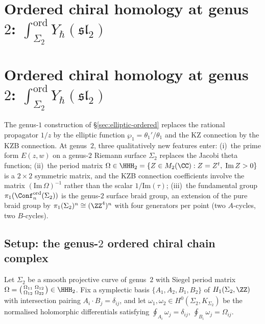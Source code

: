 
\section{Ordered chiral homology at genus~$2$:
$\int_{\Sigma_2}^{\mathrm{ord}} Y_\hbar(\mathfrak{sl}_2)$}


\section{Ordered chiral homology at genus~$2$:
$\int_{\Sigma_2}^{\mathrm{ord}} Y_\hbar(\mathfrak{sl}_2)$}
\label{sec:genus2-ordered}

The genus-$1$ construction of \S\ref{sec:elliptic-ordered}
replaces the rational propagator $1/z$ by the elliptic
function $\wp_1 = \theta_1'/\theta_1$ and the KZ connection
by the KZB connection. At genus~$2$, three qualitatively
new features enter: (i)~the prime form $E(z,w)$ on a
genus-$2$ Riemann surface $\Sigma_2$ replaces the Jacobi
theta function; (ii)~the period matrix
$\Omega \in \HHH_2 = \{Z \in M_2(\CC) : Z = Z^t,\;
\mathrm{Im}\,Z > 0\}$ is a $2 \times 2$ symmetric matrix,
and the KZB connection coefficients involve the matrix
$(\mathrm{Im}\,\Omega)^{-1}$ rather than the scalar
$1/\mathrm{Im}(\tau)$; (iii)~the fundamental group
$\pi_1(\Conf_n^{\mathrm{ord}}(\Sigma_2))$ is the genus-$2$
surface braid group, an extension of the pure braid group
by $\pi_1(\Sigma_2)^n \cong (\ZZ^4)^n$ with four generators
per point (two $A$-cycles, two $B$-cycles).

\subsection{Setup: the genus-$2$ ordered chiral chain
complex}
\label{subsec:genus2-setup}

Let $\Sigma_2$ be a smooth projective curve of genus~$2$
with Siegel period matrix
$\Omega = \bigl(\begin{smallmatrix}
\Omega_{11} & \Omega_{12} \\
\Omega_{12} & \Omega_{22}
\end{smallmatrix}\bigr)
\in \HHH_2$.
Fix a symplectic basis
$\{A_1, A_2, B_1, B_2\}$ of $H_1(\Sigma_2, \ZZ)$
with intersection pairing
$A_i \cdot B_j = \delta_{ij}$, and let
$\omega_1, \omega_2 \in H^0(\Sigma_2, K_{\Sigma_2})$
be the normalised holomorphic differentials satisfying
$\oint_{A_i} \omega_j = \delta_{ij}$,
$\oint_{B_i} \omega_j = \Omega_{ij}$.

